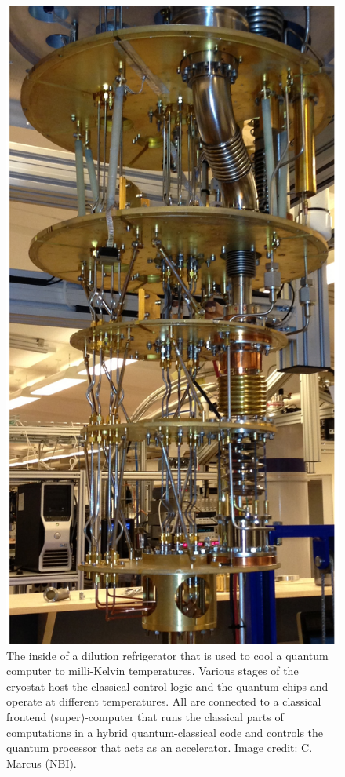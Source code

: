 \documentclass[journal]{IEEEtran}
\begin{document}
\begin{figure}[t]
\centering
\includegraphics[width=\columnwidth]{figures/cryostat}
\caption{The inside of a dilution refrigerator that is used to cool a quantum computer to milli-Kelvin temperatures. Various stages of the cryostat host the classical control logic and the quantum chips and operate at different temperatures. All are connected to a classical frontend (super)-computer that runs the classical parts of computations in a hybrid quantum-classical code and controls the quantum processor that acts as an accelerator. Image credit: C. Marcus (NBI).
}
\label{fig:cryo}
\end{figure}
\end{document}
